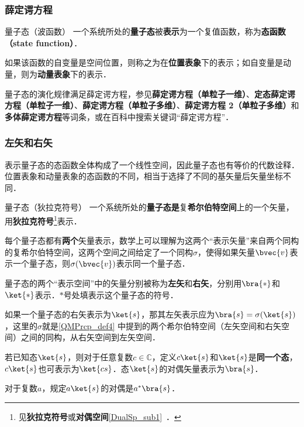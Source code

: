 \subsubsection{薛定谔方程}

\begin{definition}{量子态（波函数）}\label{QMPrcp_def6}
一个系统所处的\textbf{量子态}被\textbf{表示}为一个复值函数，称为\textbf{态函数（state function）}．

如果该函数的自变量是空间位置，则称之为在\textbf{位置表象}下的表示；如自变量是动量，则为\textbf{动量表象}下的表示．
\end{definition}

量子态的演化规律满足薛定谔方程，参见\textbf{薛定谔方程（单粒子一维）}、\textbf{定态薛定谔方程（单粒子一维）}、\textbf{薛定谔方程（单粒子多维）}、\textbf{薛定谔方程 2（单粒子多维）}和\textbf{多体薛定谔方程}等词条，或在百科中搜索关键词“薛定谔方程”．

\subsubsection{左矢和右矢}

表示量子态的态函数全体构成了一个线性空间，因此量子态也有等价的代数诠释．位置表象和动量表象的态函数的不同，相当于选择了不同的基矢量后矢量坐标不同．

\begin{definition}{量子态（狄拉克符号）}\label{QMPrcp_def4}
一个系统所处的\textbf{量子态}\textbf{是}复\textbf{希尔伯特空间}上的一个矢量，用\textbf{狄拉克符号}\footnote{见\textbf{狄拉克符号}或\textbf{对偶空间}\autoref{DualSp_sub1}~．}表示．

每个量子态都有\textbf{两个}矢量表示，数学上可以理解为这两个“表示矢量”来自两个同构的复希尔伯特空间，这两个空间之间给定了一个同构$\sigma$，使得如果矢量$\bvec{v}$表示一个量子态，则$\sigma(\bvec{v})$表示同一个量子态．

量子态的两个“表示空间”中的矢量分别被称为\textbf{左矢}和\textbf{右矢}，分别用$\bra{*}$和$\ket{*}$表示．$*$号处填表示这个量子态的符号．

\end{definition}

如果一个量子态的右矢表示为$\ket{s}$，那其左矢表示应为$\bra{s}=\sigma(\ket{s})$，这里的$\sigma$就是\autoref{QMPrcp_def4} 中提到的两个希尔伯特空间（左矢空间和右矢空间）之间的同构，从右矢空间到左矢空间．

\begin{definition}{}\label{QMPrcp_def2}

若已知态$\ket{s}$，则对于任意复数$c\in\mathbb{C}$，定义$c\ket{s}$和$\ket{s}$是\textbf{同一个态}，$c\ket{s}$也可表示为$\ket{cs}$．态$\ket{s}$的对偶矢量表示为$\bra{s}$．

对于复数$a$，规定$a\ket{s}$的对偶是$a^*\bra{s}$．
\end{definition}




